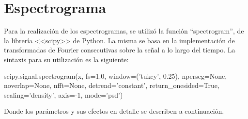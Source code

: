 \documentclass[assd_tp2_main.tex]{subfiles}
\begin{document}
\section{Espectrograma}

Para la realizaci\'on de los espectrogramas, se utiliz\'o la funci\'on ``spectrogram'', de la librer\'ia <<scipy>> de Python. La misma se basa en la implementaci\'on de transformadas de Fourier consecutivas sobre la se\~nal a lo largo del tiempo. La sintaxis para su utilizaci\'on es la siguiente:

\begin{center}
scipy.signal.spectrogram(x, fs=1.0, window=('tukey', 0.25), nperseg=None, noverlap=None, nfft=None, detrend='constant', return\_onesided=True, scaling='density', axis=-1, mode='psd')
\end{center}

Donde los par\'ametros y sus efectos en detalle se describen a continuaci\'on.
\end{document}
